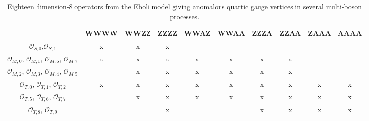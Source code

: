 \begin{table}[h]
    \caption{Eighteen dimension-8 operators from the Eboli model giving anomalous quartic gauge vertices in several multi-boson processes.\label{tab:aQGC_Operators}}
    \begin{center}
    \begin{tabular}{c|ccccccccc}
        \hline 
        & {\scriptsize{}WWWW} & {\scriptsize{}WWZZ} & {\scriptsize{}ZZZZ} & {\scriptsize{}WWAZ} & {\scriptsize{}WWAA} & {\scriptsize{}ZZZA} & {\scriptsize{}ZZAA} & {\scriptsize{}ZAAA} & {\scriptsize{}AAAA}\tabularnewline
        \hline
        \hline 
        {\footnotesize{}$\mathcal{O}_{S,0}$,$\mathcal{O}_{S,1}$} & {\scriptsize{}x} & {\scriptsize{}x} & {\scriptsize{}x} &  &  &  &  &  & \tabularnewline
        {\footnotesize{}$\mathcal{O}_{M,0}$, $\mathcal{O}_{M,1}$, $\mathcal{O}_{M,6}$, $\mathcal{O}_{M,7}$} & {\scriptsize{}x} & {\scriptsize{}x} & {\scriptsize{}x} & {\scriptsize{}x} & {\scriptsize{}x} & {\scriptsize{}x} & {\scriptsize{}x} &  & \tabularnewline
        {\footnotesize{}$\mathcal{O}_{M,2}$, $\mathcal{O}_{M,3}$, $\mathcal{O}_{M,4}$, $\mathcal{O}_{M,5}$} &  & {\scriptsize{}x} & {\scriptsize{}x} & {\scriptsize{}x} & {\scriptsize{}x} & {\scriptsize{}x} & {\scriptsize{}x} &  & \tabularnewline
        {\footnotesize{}$\mathcal{O}_{T,0}$, $\mathcal{O}_{T,1}$, $\mathcal{O}_{T,2}$} & {\scriptsize{}x} & {\scriptsize{}x} & {\scriptsize{}x} & {\scriptsize{}x} & {\scriptsize{}x} & {\scriptsize{}x} & {\scriptsize{}x} & {\scriptsize{}x} & {\scriptsize{}x}\tabularnewline
        {\footnotesize{}$\mathcal{O}_{T,5}$, $\mathcal{O}_{T,6}$, $\mathcal{O}_{T,7}$} &  & {\scriptsize{}x} & {\scriptsize{}x} & {\scriptsize{}x} & {\scriptsize{}x} & {\scriptsize{}x} & {\scriptsize{}x} & {\scriptsize{}x} & {\scriptsize{}x}\tabularnewline
        {\footnotesize{}$\mathcal{O}_{T,8}$, $\mathcal{O}_{T,9}$} &  &  & {\scriptsize{}x} &  &  & {\scriptsize{}x} & {\scriptsize{}x} & {\scriptsize{}x} & {\scriptsize{}x}\tabularnewline
        \hline
    \end{tabular}
    \end{center}
\end{table}

